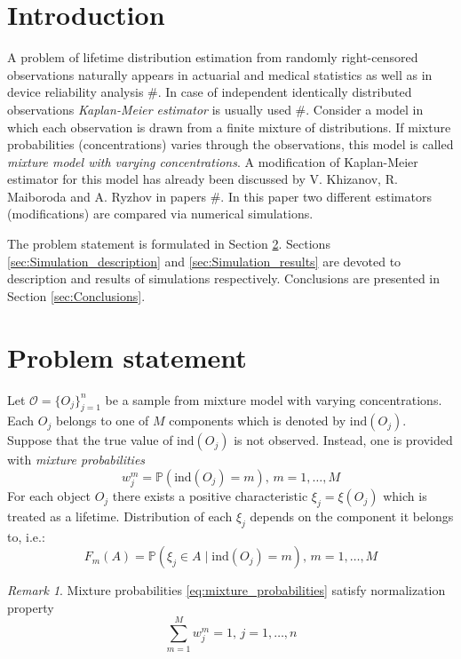 \documentclass[12pt,reqno,a4paper,oneside,draft]{article}
\theoremstyle{plain}
\theoremstyle{definition}
\theoremstyle{remark}
\newtheorem*{rem}{Remark}
\begin{document}
\tableofcontents


\section{Introduction}
\label{sec:Introduction}
A problem of lifetime distribution estimation from randomly right-censored observations naturally appears in actuarial and medical statistics as well as in device reliability analysis $\#$. In case of independent identically distributed observations \emph{Kaplan-Meier estimator} is usually used $\#$. Consider a model in which each observation is drawn from a finite mixture of distributions. If mixture probabilities (concentrations) varies through the observations, this model is called \emph{mixture model with varying concentrations}. A modification of Kaplan-Meier estimator for this model has already been discussed by V. Khizanov, R. Maiboroda and A. Ryzhov in papers $\#$. In this paper two different estimators (modifications) are compared via numerical simulations.

The problem statement is formulated in Section \ref{sec:Problem_statement}. Sections \ref{sec:Simulation_description} and \ref{sec:Simulation_results} are devoted to description and results of simulations respectively. Conclusions are presented in Section \ref{sec:Conclusions}.

\section{Problem statement}
\label{sec:Problem_statement}
Let $\mathcal O = \{O_j\}_{j=1}^n$ be a sample from mixture model with varying concentrations. Each $O_j$ belongs to one of $M$ components which is denoted by $\mathrm{ind}(O_j)$. Suppose that the true value of $\mathrm{ind}(O_j)$ is not observed. Instead, one is provided with \emph{mixture probabilities}
\begin{equation}
\label{eq:mixture_probabilities}
w_j^m = \mathbb P(\mathrm{ind}(O_j) = m), \, m=1,\ldots, M
\end{equation}
For each object $O_j$ there exists a positive characteristic $\xi _j = \xi (O_j)$ which is treated as a lifetime. Distribution of each $\xi _j$ depends on the component it belongs to, i.e.:
\begin{equation}
\label{eq:conditional_distribution}
F_m (A) = \mathbb P(\xi _j \in A \mid \mathrm{ind}(O_j) = m), \, m=1,\ldots , M
\end{equation}
\begin{rem}
Mixture probabilities \eqref{eq:mixture_probabilities} satisfy normalization property
\begin{equation}
\label{eq:mix_prob_constraint}
\sum _{m=1}^M w_j^m = 1, \, j = 1,\ldots, n
\end{equation}
\end{rem}
\end{document}
